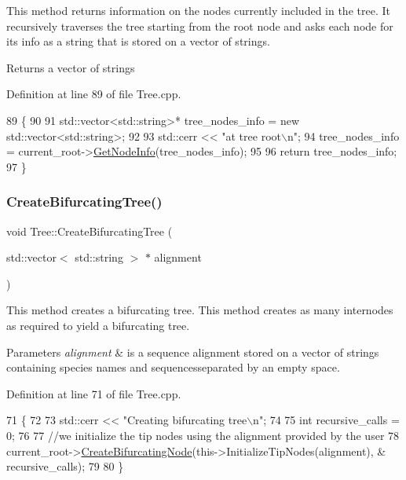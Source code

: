 This method returns information on the nodes currently included in the tree. It recursively traverses the tree starting from the root node and asks each node for its info as a string that is stored on a vector of strings.

\begin{DoxyReturn}{Returns}
a vector of strings 
\end{DoxyReturn}


Definition at line 89 of file Tree.\+cpp.


\begin{DoxyCode}
89                                                 \{
90   
91   std::vector<std::string>* tree\_nodes\_info = \textcolor{keyword}{new} std::vector<std::string>;
92   
93   std::cerr << \textcolor{stringliteral}{"at tree root\(\backslash\)n"};
94   tree\_nodes\_info = current\_root->\hyperlink{classNode_aeb57ef43b22fa37c2855ebb07e4e7331}{GetNodeInfo}(tree\_nodes\_info);
95   
96   \textcolor{keywordflow}{return} tree\_nodes\_info;
97 \}
\end{DoxyCode}
\mbox{\label{classTree_ac456dedd5e42bb0fea807aeb526e5a93}} 
\subsubsection{\texorpdfstring{Create\+Bifurcating\+Tree()}{CreateBifurcatingTree()}}
{\footnotesize\ttfamily void Tree\+::\+Create\+Bifurcating\+Tree (\begin{DoxyParamCaption}\item[{std\+::vector$<$ std\+::string $>$ $\ast$}]{alignment }\end{DoxyParamCaption})}

This method creates a bifurcating tree. This method creates as many internodes as required to yield a bifurcating tree.


\begin{DoxyParams}{Parameters}
{\em alignment} & is a sequence alignment stored on a vector of strings containing species names and sequencesseparated by an empty space. \\
\hline
\end{DoxyParams}


Definition at line 71 of file Tree.\+cpp.


\begin{DoxyCode}
71                                                                \{
72   
73   std::cerr << \textcolor{stringliteral}{"Creating bifurcating tree\(\backslash\)n"};
74   
75   \textcolor{keywordtype}{int} recursive\_calls = 0;
76   
77   \textcolor{comment}{//we initialize the tip nodes using the alignment provided by the user}
78   current\_root->\hyperlink{classNode_a73e4640e16847b3c1b655930c193d03b}{CreateBifurcatingNode}(this->InitializeTipNodes(alignment), &
      recursive\_calls);
79   
80 \}
\end{DoxyCode}
\mbox{\label{classTree_ac446f0f8211fcc033502690a9a164e95}} 
